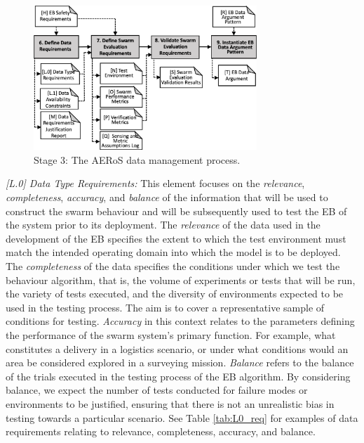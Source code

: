 \documentclass[runningheads]{llncs}
\begin{document}
\begin{figure}[!t]
	\centering
	\includegraphics[width=0.75\textwidth]{figures/AERoS-Stage3.png}%
	\vspace{-2ex}
	\caption{Stage 3: The AERoS data management process.}
	\label{amlas-a-stage3}
	\vspace{-4ex}
\end{figure}

\emph{[L.0] Data Type Requirements:}
This element focuses on the \emph{relevance}, \emph{completeness}, \emph{accuracy}, and \emph{balance} of the information that will be used to construct the swarm behaviour and will be subsequently used to test the EB of the system prior to its deployment. The \emph{relevance} of the data used in the development of the EB specifies the extent to which the test environment must match the intended operating domain into which the model is to be deployed. The \emph{completeness} of the data specifies the conditions under which we test the behaviour algorithm, that is, the volume of experiments or tests that will be run, the variety of tests executed, and the diversity of environments expected to be used in the testing process. The aim is to cover a representative sample of conditions for testing. \emph{Accuracy} in this context relates to the parameters defining the performance of the swarm system's primary function. For example, what constitutes a delivery in a logistics scenario, or under what conditions would an area be considered explored in a surveying mission. \emph{Balance} refers to the balance of the trials executed in the testing process of the EB algorithm. By considering balance, we expect the number of tests conducted for failure modes or environments to be justified, ensuring that there is not an unrealistic bias in testing towards a particular scenario. See Table \ref{tab:L0_req} for examples of data requirements relating to relevance, completeness, accuracy, and balance.
\end{document}
